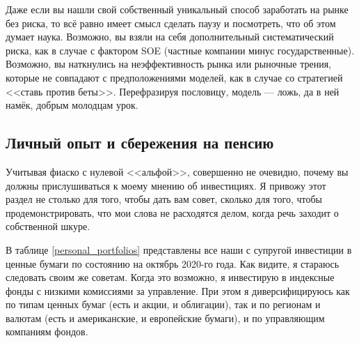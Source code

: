 Даже если вы нашли свой собственный уникальный способ заработать на рынке без
риска, то всё равно имеет смысл сделать паузу и посмотреть, что об этом думает
наука. Возможно, вы взяли на себя дополнительный систематический риска, как в
случае с фактором SOE (частные компании минус государственные). Возможно, вы 
наткнулись на неэффективность рынка или рыночные трения, которые не совпадают
с предположениями моделей, как в случае со стратегией <<ставь против беты>>. 
Перефразируя пословицу, модель --- ложь, да в ней намёк, добрым молодцам урок.

\subsection{Личный опыт и сбережения на пенсию}

Учитывая фиаско с нулевой <<альфой>>, совершенно не очевидно, почему вы должны
прислушиваться к моему мнению об инвестициях. Я привожу этот раздел не столько
для того, чтобы дать вам совет, сколько для того, чтобы продемонстрировать, что
мои слова не расходятся делом, когда речь заходит о собственной шкуре.

В таблице \ref{personal_portfolios} представлены все наши с супругой инвестиции
в ценные бумаги по состоянию на октябрь 2020-го года. Как видите, я стараюсь
следовать своим же советам. Когда это возможно, я инвестирую в индексные фонды 
с низкими комиссиями за управление. При этом я диверсифицируюсь как по типам
ценных бумаг (есть и акции, и облигации), так и по регионам и валютам (есть и
американские, и европейские бумаги), и по управляющим компаниям фондов.

